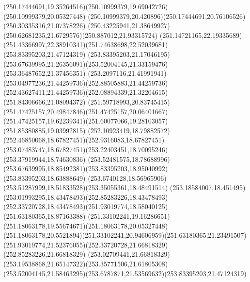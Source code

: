 {{\curveto(250.17444691,19.35264516)(250.10999379,19.69042726)(250.10999379,20.05327448)
\curveto(250.10999379,20.420896)(250.17444691,20.76106526)(250.30335316,21.07378226)
\curveto(250.43225941,21.38649927)(250.62681235,21.6729576)(250.887012,21.93315724)
\curveto(251.14721165,22.19335689)(251.43366997,22.38910341)(251.74638698,22.52039681)
\closepath
\moveto(253.83395203,21.47124319)
\lineto(253.83395203,21.17046195)
\curveto(253.67639995,21.26356091)(253.52004145,21.33159476)(253.36487652,21.37456351)
\curveto(253.2097116,21.41991941)(253.04977236,21.44259736)(252.88505883,21.44259736)
\curveto(252.43627411,21.44259736)(252.08894339,21.32204615)(251.84306666,21.08094372)
\curveto(251.59718993,20.83745415)(251.47425157,20.49847846)(251.47425157,20.06401667)
\curveto(251.47425157,19.62239341)(251.60077066,19.28103057)(251.85380885,19.03992815)
\curveto(252.10923419,18.79882572)(252.46850068,18.67827451)(252.9316083,18.67827451)
\curveto(253.07483747,18.67827451)(253.22403451,18.70095246)(253.37919944,18.74630836)
\curveto(253.52481575,18.78688996)(253.67639995,18.85492381)(253.83395203,18.95040992)
\lineto(253.83395203,18.63888649)
\curveto(253.6740128,18.56965906)(253.51287999,18.51833528)(253.35055361,18.48491514)
\curveto(253.18584007,18.451495)(253.01993295,18.43478493)(252.85283226,18.43478493)
\curveto(252.33720728,18.43478493)(251.93019774,18.58040125)(251.63180365,18.87163388)
\curveto(251.33102241,19.16286651)(251.18063178,19.55674671)(251.18063178,20.05327448)
\curveto(251.18063178,20.5521894)(251.33102241,20.94606959)(251.63180365,21.23491507)
\curveto(251.93019774,21.52376055)(252.33720728,21.66818329)(252.85283226,21.66818329)
\curveto(253.02709441,21.66818329)(253.19538868,21.65147322)(253.35771506,21.61805308)
\curveto(253.52004145,21.58463295)(253.6787871,21.53569632)(253.83395203,21.47124319)
\closepath
}
}
